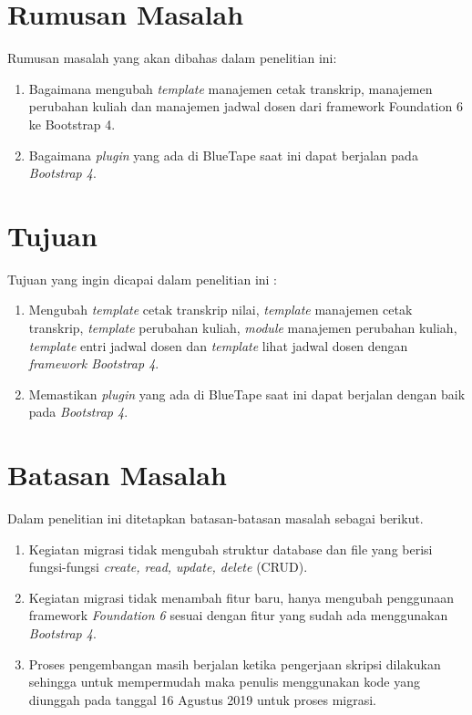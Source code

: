 \section{Rumusan Masalah}
\label{sec:rumusan}
Rumusan masalah yang akan dibahas dalam penelitian ini:
\begin{enumerate}
	\item Bagaimana mengubah \textit{template} manajemen cetak transkrip, manajemen perubahan kuliah dan manajemen jadwal dosen dari framework Foundation 6 ke Bootstrap 4.
	\item Bagaimana \textit{plugin} yang ada di BlueTape saat ini dapat berjalan pada \textit{Bootstrap 4}.
\end{enumerate}

\section{Tujuan}
\label{sec:tujuan}
Tujuan yang ingin dicapai dalam penelitian ini :

	\begin{enumerate}	
	\item Mengubah \textit{template} cetak transkrip nilai, \textit{template} manajemen cetak transkrip, \textit{template} perubahan kuliah, \textit{module} manajemen perubahan kuliah, \textit{template} entri jadwal dosen dan \textit{template} lihat jadwal dosen dengan \textit{framework Bootstrap 4}.
	\item Memastikan \textit{plugin} yang ada di BlueTape saat ini dapat berjalan dengan baik pada \textit{Bootstrap 4}.
	\end{enumerate}

\section{Batasan Masalah}
\label{sec:batasan}
Dalam penelitian ini ditetapkan batasan-batasan masalah sebagai berikut.
\begin{enumerate}	
	\item Kegiatan migrasi tidak mengubah struktur database dan file yang berisi fungsi-fungsi \textit{create, read, update, delete} (CRUD).
	\item Kegiatan migrasi tidak menambah fitur baru, hanya mengubah penggunaan framework \textit{ Foundation 6} sesuai dengan fitur yang sudah ada menggunakan \textit{Bootstrap 4}.
	\item Proses pengembangan masih berjalan ketika pengerjaan skripsi dilakukan sehingga untuk mempermudah maka penulis menggunakan kode yang diunggah pada tanggal 16 Agustus 2019 untuk proses migrasi.	
	\end{enumerate}		


